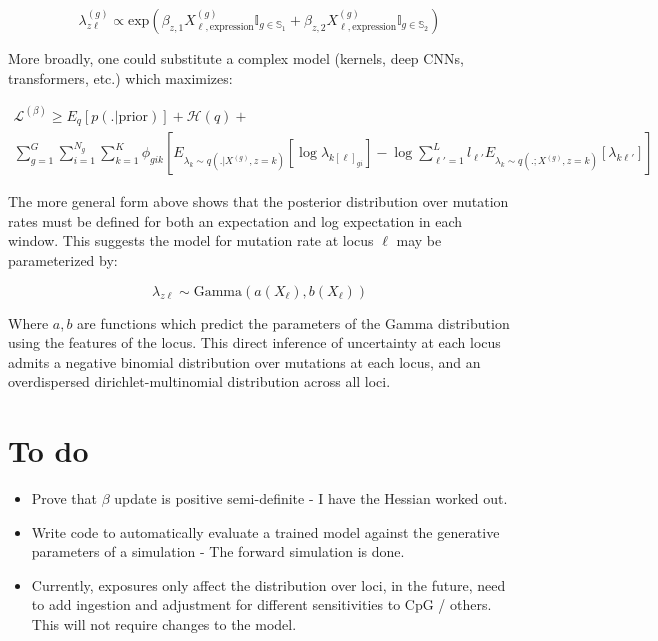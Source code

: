\documentclass{article}
\newcommand{\Lagr}{\mathcal{L}}
\begin{document}
\begin{equation}
\lambda^{(g)}_{z\ell} \propto \textrm{exp}\left( \beta_{z,1} X^{(g)}_{\ell,\textrm{expression}} \mathbb{I}_{g\in\mathbb{S}_1} + \beta_{z,2} X^{(g)}_{\ell,\textrm{expression}} \mathbb{I}_{g\in\mathbb{S}_2} \right)
\end{equation}

More broadly, one could substitute a complex model (kernels, deep CNNs, transformers, etc.) which maximizes:

\begin{equation}
\begin{split}
\Lagr^{(\beta)} \geq E_q [ p(. | \textrm{prior}) ] + \mathcal{H}(q) + \\
	\sum_{g=1}^G \sum_{i=1}^{N_g} \sum_{k=1}^K  \phi_{gik} \left[ E_{\lambda_k \sim q(.|X^{(g)}, z=k)} [ \log \lambda_{k[\ell]_{gi}}] - \log{\sum_{\ell'=1}^L l_{\ell'}  E_{\lambda_k \sim q(.;X^{(g)}, z=k)}[\lambda_{k\ell'}]} \right]
\end{split}
\end{equation}

The more general form above shows that the posterior distribution over mutation rates must be defined for both an expectation and log expectation in each window. This suggests the model for mutation rate at locus $\ell$ may be parameterized by:

\begin{equation}
\lambda_{z\ell} \sim \mathrm{Gamma}(a(X_\ell), b(X_\ell))
\end{equation}

Where $a, b$ are functions which predict the parameters of the Gamma distribution using the features of the locus. This direct inference of uncertainty at each locus admits a negative binomial distribution over mutations at each locus, and an overdispersed dirichlet-multinomial distribution across all loci.

\section{To do}

\begin{itemize}
  \item Prove that $\beta$ update is positive semi-definite - I have the Hessian worked out.
  \item Write code to automatically evaluate a trained model against the generative parameters of a simulation - The forward simulation is done.
  \item Currently, exposures only affect the distribution over loci, in the future, need to add ingestion and adjustment for 
  	different sensitivities to CpG / others. This will not require changes to the model.
\end{itemize}
\end{document}
